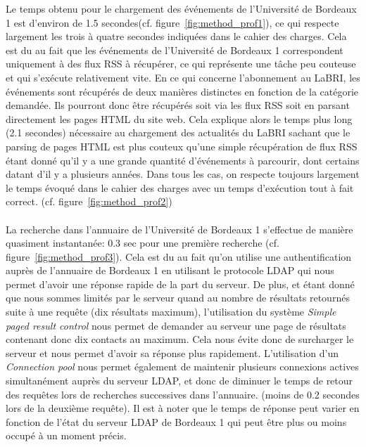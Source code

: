 Le temps obtenu pour le chargement des événements de l'Université de Bordeaux 1 est d'environ de 1.5 secondes(cf. figure~\ref{fig:method_prof1}), ce qui respecte largement les trois à quatre secondes indiquées dans le cahier des charges. Cela est du au fait que les événements de l'Université de Bordeaux 1 correspondent uniquement à des flux RSS à récupérer, ce qui représente une tâche peu couteuse et qui s'exécute relativement vite.
En ce qui concerne l'abonnement au LaBRI, les événements sont récupérés de deux manières distinctes en fonction de la catégorie demandée. Ils pourront donc être récupérés soit via les flux RSS soit en parsant directement les pages HTML du site web. Cela explique alors le temps plus long (2.1 secondes) nécessaire au chargement des actualités du LaBRI sachant que le parsing de pages HTML est plus couteux qu'une simple récupération de flux RSS étant donné qu'il y a une grande quantité d'événements à parcourir, dont certains datant d'il y a plusieurs années. Dans tous les cas, on respecte toujours largement le temps évoqué dans le cahier des charges avec un temps d'exécution tout à fait correct. (cf. figure~\ref{fig:method_prof2})\\\\
 

La recherche dans l'annuaire de l'Université de Bordeaux 1 s'effectue de manière quasiment instantanée: 0.3 sec pour une première recherche (cf. figure~\ref{fig:method_prof3}). Cela est du au fait qu'on utilise une authentification auprès de l'annuaire de Bordeaux 1 en utilisant le protocole LDAP qui nous permet d'avoir une réponse rapide de la part du serveur. De plus, et étant donné que nous sommes limités par le serveur quand au nombre de résultats retournés suite à une requête (dix résultats maximum), l'utilisation du système \emph{Simple paged result control} nous permet de demander au serveur une page de résultats contenant donc dix contacts au maximum. Cela nous évite donc de surcharger le serveur et nous permet d'avoir sa réponse plus rapidement. L'utilisation d'un \emph{Connection pool} nous permet également de maintenir plusieurs connexions actives simultanément auprès du serveur LDAP, et donc de diminuer le temps de retour des requêtes lors de recherches successives dans l'annuaire. (moins de 0.2 secondes lors de la deuxième requête). Il est à noter que le temps de réponse peut varier en fonction de l'état du serveur LDAP de Bordeaux 1 qui peut être plus ou moins occupé à un moment précis.\\\\

